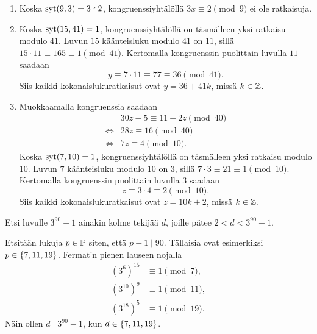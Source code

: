 \documentclass[11pt,a4paper]{amsart}
\begin{document}
\begin{solution}
  \leavevmode\par
  \begin{enumerate}[label=(\alph*), nosep]
    \item Koska \(\operatorname{syt}(9, 3) = 3 \nmid 2\), kongruenssiyhtälöllä
      \(3x \equiv 2 \pmod{9}\) ei ole ratkaisuja.
    \item Koska \(\operatorname{syt}(15, 41) = 1\), kongruenssiyhtälöllä on täsmälleen
      yksi ratkaisu modulo \(41\). Luvun \(15\) käänteisluku modulo \(41\)
      on \(11\), sillä \(15 \cdot 11 \equiv 165 \equiv 1 \pmod{41}\).
      Kertomalla kongruenssin puolittain luvulla \(11\) saadaan
      \[
        y \equiv 7 \cdot 11 \equiv 77 \equiv 36 \pmod{41}.
      \]
      Siis kaikki kokonaislukuratkaisut ovat \(y = 36 + 41k\), missä
      \(k \in \mathbb{Z}\).
    \item Muokkaamalla kongruenssia saadaan
      \[
        \begin{aligned}
          &30z - 5 \equiv 11 + 2z \pmod{40} \\
          \iff{} &28z \equiv 16 \pmod{40} \\
          \iff{} &7z \equiv 4 \pmod{10}.
        \end{aligned}
      \]
      Koska \(\operatorname{syt}(7, 10) = 1\), kongruenssiyhtälöllä on täsmälleen yksi
      ratkaisu modulo \(10\). Luvun \(7\) käänteisluku modulo \(10\) on \(3\),
      sillä \(7 \cdot 3 \equiv 21 \equiv 1 \pmod{10}\). Kertomalla
      kongruenssin puolittain luvulla \(3\) saadaan
      \[
        z \equiv 3 \cdot 4 \equiv 2 \pmod{10}.
      \]
      Siis kaikki kokonaislukuratkaisut ovat \(z = 10k + 2\), missä
      \(k \in \mathbb{Z}\).
  \end{enumerate}
\end{solution}

\newpage

\begin{exercise}
  Etsi luvulle \(3^{90} - 1\) ainakin kolme tekijää \(d\), joille pätee
  \(2 < d < 3^{90} - 1\).
\end{exercise}

\begin{solution}
  Etsitään lukuja \(p \in \mathbb{P}\) siten, että \(p - 1 \mid 90\). Tällaisia
  ovat esimerkiksi \(p \in \left\lbrace7, 11, 19\right\rbrace\). Fermat'n pienen lauseen nojalla
  \[
    \begin{aligned}
      (3^6)^{15} &\equiv 1 \pmod{7}, \\
      (3^{10})^9 &\equiv 1 \pmod{11}, \\
      (3^{18})^5 &\equiv 1 \pmod{19}.
    \end{aligned}
  \]
  Näin ollen \(d \mid 3^{90} - 1\), kun \(d \in \left\lbrace7, 11, 19\right\rbrace\).
\end{solution}
\end{document}
